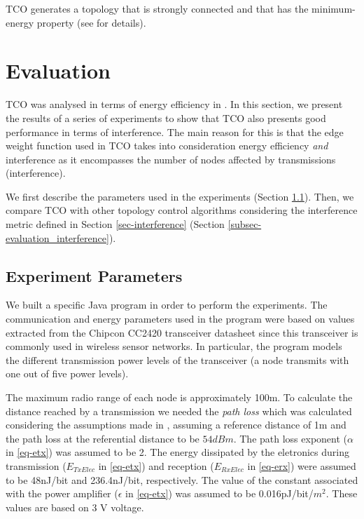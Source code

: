 \documentclass{llncs}
\begin{document}
TCO generates a topology that is strongly connected and that has the \linebreak \mbox{minimum-energy} property (see \cite{Assis09} for details).

\section{Evaluation}
\label{sec-evaluation}

TCO was analysed in terms of energy efficiency in \cite{Assis09,Telemaco2009}. In this section, we present the results of a series of experiments to show that  TCO also presents good performance in terms of interference. The main reason for this is that the edge weight function used in \mbox{TCO} takes into consideration energy
efficiency \emph{and} interference as it encompasses the number of nodes affected by transmissions (interference).

We first describe the parameters used in the experiments (Section \ref{subsec-parameters}). Then, we compare TCO with other topology control algorithms considering the interference metric defined in Section \ref{sec-interference} (Section \ref{subsec-evaluation_interference}).
 
\subsection{Experiment Parameters}
\label{subsec-parameters}

We built a specific Java program in order to perform the experiments. The communication and energy parameters used in the program were based on values extracted from the 
Chipcon CC2420 transceiver datasheet \cite{CC2420} since this transceiver is commonly used in wireless sensor networks. In particular, the program models the different transmission power levels
of the transceiver (a node transmits with one out of five power levels). 


The maximum radio range of each node is approximately 100m. 
To calculate the distance reached by a transmission we needed the \emph{path loss} which was calculated considering the assumptions made in \cite{Braem07}, assuming
a reference distance of 1m and the path loss at the referential distance to be $54dBm$. 
The path loss exponent ($\alpha$ in \eqref{eq-etx}) was assumed to be 2.
The energy dissipated by the eletronics during transmission 
($E_{TxElec}$ in \eqref{eq-etx}) and reception ($E_{RxElec}$ in \eqref{eq-erx}) were assumed to be 
48nJ/bit and 236.4nJ/bit, respectively. The value of the constant associated with the power amplifier ($\epsilon$ in \eqref{eq-etx}) was assumed to be 
0.016pJ/bit/$m^2$. These values are based on 3 V voltage.
\end{document}
